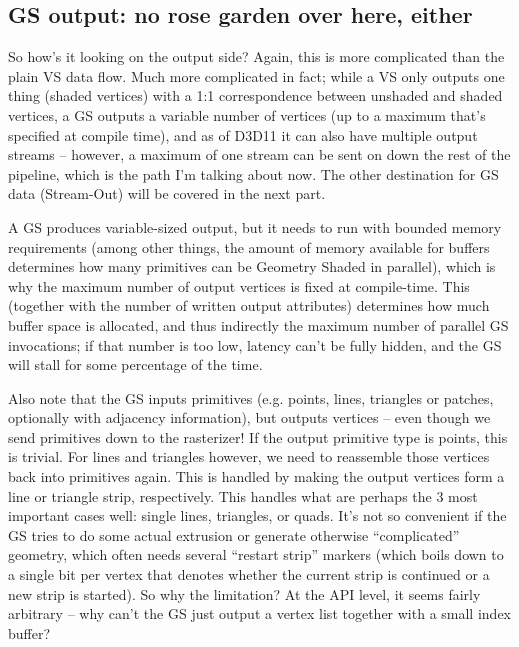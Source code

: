 \documentclass[12pt]{article}
\begin{document}
\subsection{GS output: no rose garden over here, either}
\label{sec:org4ee2fed}

So how’s it looking on the output side? Again, this is more complicated than the plain VS data flow. Much more complicated in fact; while a VS only outputs one thing (shaded vertices) with a 1:1 correspondence between unshaded and shaded vertices, a GS outputs a variable number of vertices (up to a maximum that’s specified at compile time), and as of D3D11 it can also have multiple output streams – however, a maximum of one stream can be sent on down the rest of the pipeline, which is the path I’m talking about now. The other destination for GS data (Stream-Out) will be covered in the next part.

A GS produces variable-sized output, but it needs to run with bounded memory requirements (among other things, the amount of memory available for buffers determines how many primitives can be Geometry Shaded in parallel), which is why the maximum number of output vertices is fixed at compile-time. This (together with the number of written output attributes) determines how much buffer space is allocated, and thus indirectly the maximum number of parallel GS invocations; if that number is too low, latency can’t be fully hidden, and the GS will stall for some percentage of the time.

Also note that the GS inputs primitives (e.g. points, lines, triangles or patches, optionally with adjacency information), but outputs vertices – even though we send primitives down to the rasterizer! If the output primitive type is points, this is trivial. For lines and triangles however, we need to reassemble those vertices back into primitives again. This is handled by making the output vertices form a line or triangle strip, respectively. This handles what are perhaps the 3 most important cases well: single lines, triangles, or quads. It’s not so convenient if the GS tries to do some actual extrusion or generate otherwise “complicated” geometry, which often needs several “restart strip” markers (which boils down to a single bit per vertex that denotes whether the current strip is continued or a new strip is started). So why the limitation? At the API level, it seems fairly arbitrary – why can’t the GS just output a vertex list together with a small index buffer?
\end{document}
